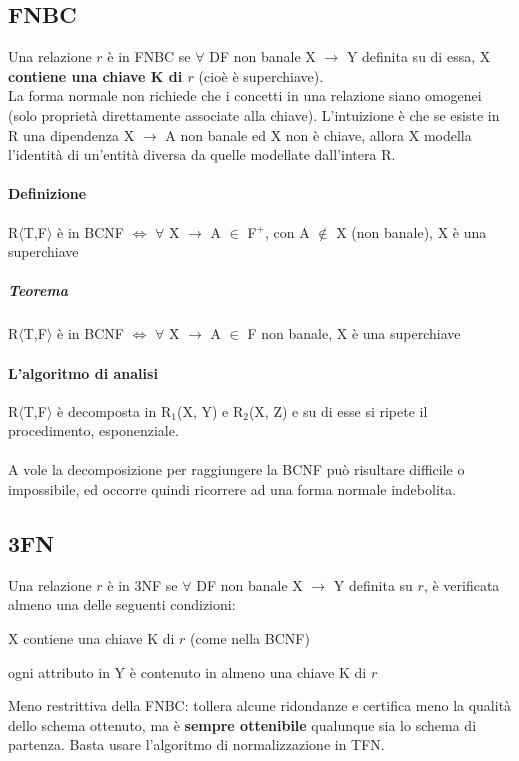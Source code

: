 \documentclass[10pt]{book}
\begin{document}
\subsection{FNBC} Una relazione $r$ è in FNBC se $\forall$ DF non banale X $\rightarrow$ Y definita su di essa, X \textbf{contiene una chiave K di $r$} (cioè è superchiave).\\
La forma normale non richiede che i concetti in una relazione siano omogenei (solo proprietà direttamente associate alla chiave). L'intuizione è che se esiste in R una dipendenza X $\rightarrow$ A non banale ed X non è chiave, allora X modella l'identità di un'entità diversa da quelle modellate dall'intera R.
\paragraph{Definizione} R$\langle$T,F$\rangle$ è in BCNF $\Leftrightarrow$ $\forall$ X $\rightarrow$ A $\in$ F$^+$, con A $\not\in$ X (non banale), X è una superchiave
\subparagraph{Teorema} R$\langle$T,F$\rangle$ è in BCNF $\Leftrightarrow$ $\forall$ X $\rightarrow$ A $\in$ F non banale, X è una superchiave
\paragraph{L'algoritmo di analisi} R$\langle$T,F$\rangle$ è decomposta in R$_1$(X, Y) e R$_2$(X, Z) e su di esse si ripete il procedimento, esponenziale.
\paragraph{} A vole la decomposizione per raggiungere la BCNF può risultare difficile o impossibile, ed occorre quindi ricorrere ad una forma normale indebolita.
\subsection{3FN}
Una relazione $r$ è in 3NF se $\forall$ DF non banale X $\rightarrow$ Y definita su $r$, è verificata almeno una delle seguenti condizioni:
\begin{list}{}{}
	\item X contiene una chiave K di $r$ (come nella BCNF)
	\item ogni attributo in Y è contenuto in almeno una chiave K di $r$
\end{list}
Meno restrittiva della FNBC: tollera alcune ridondanze e certifica meno la qualità dello schema ottenuto, ma è \textbf{sempre ottenibile} qualunque sia lo schema di partenza. Basta usare l'algoritmo di normalizzazione in TFN.
\end{document}
